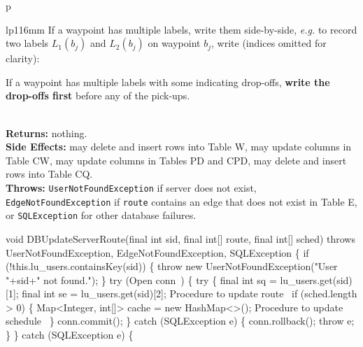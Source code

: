 \begin{tabular}{p{\textwidth}}
\begin{tabular}{lp{116mm}}
If a waypoint has multiple labels, write them side-by-side, \textit{e.g.}
to record two labels $L_1(b_j)$ and $L_2(b_j)$ on waypoint $b_j$, write
(indices omitted for clarity):


If a waypoint has multiple labels with some indicating drop-offs, \textbf{write
the drop-offs first} before any of the pick-ups.
\end{tabular}\\
\textbf{Returns:} nothing.\\
\textbf{Side Effects:} may delete and insert rows into Table W, may
update columns in Table CW, may update columns in Tables PD and CPD,
may delete and insert rows into Table CQ.\\
\textbf{Throws:} {\tt{}UserNotFoundException} if server does not exist,
{\tt{}EdgeNotFoundException} if {\tt{}route} contains an edge that does not exist in
Table E, or {\tt{}SQLException} for other database failures.\\
\bottomrule
\end{tabular}
\nwenddocs{}\endmoddef{}
void DBUpdateServerRoute(final int sid, final int[] route, final int[] sched)
throws UserNotFoundException, EdgeNotFoundException, SQLException \{
  if (!this.lu_users.containsKey(sid)) \{
    throw new UserNotFoundException("User "+sid+" not found.");
  \}
  try (\LA{}Open \code{}conn\edoc{}~{\nwtagstyle{}}\RA{}) \{
    try \{
      final int sq = lu_users.get(sid)[1];
      final int se = lu_users.get(sid)[2];
      \LA{}Procedure to update route~{\nwtagstyle{}}\RA{}
      if (sched.length > 0) \{
        Map<Integer, int[]> cache = new HashMap<>();
        \LA{}Procedure to update schedule~{\nwtagstyle{}}\RA{}
      \}
      conn.commit();
    \} catch (SQLException e) \{
      conn.rollback();
      throw e;
    \}
  \} catch (SQLException e) \{

